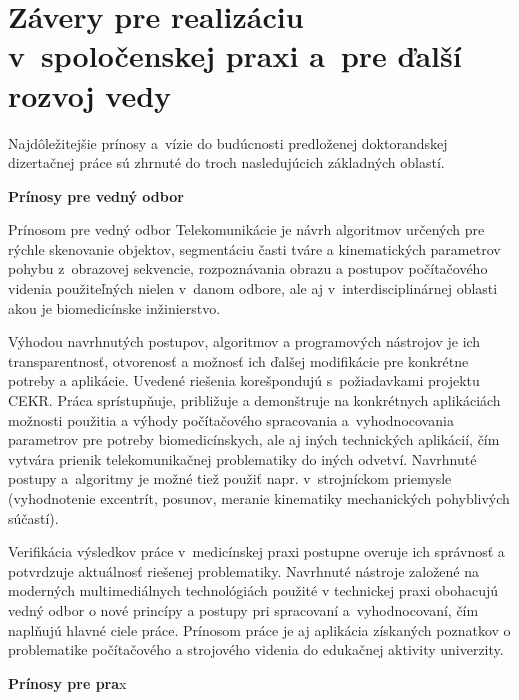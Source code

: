 \chapter{Závery pre realizáciu v spoločenskej praxi a pre ďalší rozvoj vedy}

\pagestyle{fancy}
\fancyhf{}
\fancyfoot[CE,CO]{\thepage}



Najdôležitejšie prínosy a vízie do budúcnosti predloženej doktorandskej dizertačnej práce sú zhrnuté do troch nasledujúcich základných oblastí.

\textbf{Prínosy pre vedný odbor}

Prínosom pre vedný odbor Telekomunikácie je návrh algoritmov určených pre rýchle skenovanie objektov, segmentáciu časti tváre a   kinematických parametrov pohybu z obrazovej sekvencie, rozpoznávania obrazu a postupov počítačového videnia použiteľných nielen v danom odbore, ale aj v interdisciplinárnej oblasti akou je biomedicínske inžinierstvo. 

Výhodou navrhnutých postupov, algoritmov a programových nástrojov je ich transparentnosť, otvorenosť a možnosť ich ďalšej modifikácie pre konkrétne potreby a aplikácie. Uvedené riešenia korešpondujú s požiadavkami projektu CEKR. Práca sprístupňuje, približuje a demonštruje na konkrétnych aplikáciách možnosti použitia a výhody počítačového spracovania a vyhodnocovania parametrov pre potreby biomedicínskych, ale aj iných technických aplikácií, čím vytvára prienik telekomunikačnej problematiky do iných odvetví.  Navrhnuté postupy a algoritmy je možné tiež použiť napr. v strojníckom priemysle (vyhodnotenie excentrít, posunov, meranie kinematiky mechanických pohyblivých súčastí). 

Verifikácia výsledkov práce v medicínskej praxi postupne overuje ich správnosť a potvrdzuje aktuálnosť riešenej problematiky. Navrhnuté nástroje založené na moderných multimediálnych technológiách použité v technickej praxi obohacujú vedný odbor o nové princípy a postupy pri spracovaní a vyhodnocovaní, čím naplňujú hlavné ciele práce. Prínosom práce je aj aplikácia získaných poznatkov o problematike počítačového a strojového videnia do edukačnej aktivity univerzity. 

\textbf{Prínosy pre pra}x

